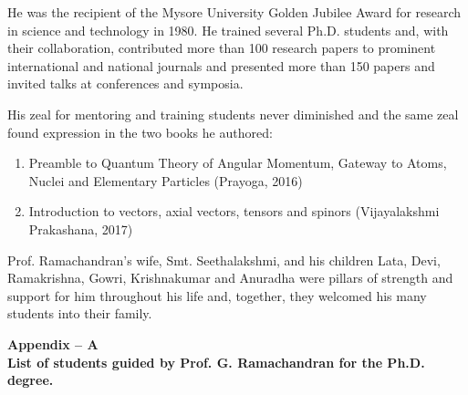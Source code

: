 He was the recipient of the Mysore University Golden Jubilee Award for research in science and technology in 1980. He trained several Ph.D. students and, with their collaboration, contributed more than 100 research papers to prominent international and national journals and presented more than 150 papers and invited talks at conferences and symposia.

His zeal for mentoring and training students never diminished and the same zeal found expression in the two books he authored:
\begin{enumerate}
\item Preamble to Quantum Theory of Angular Momentum, Gateway to Atoms, Nuclei and Elementary Particles (Prayoga, 2016)

\item Introduction to vectors, axial vectors, tensors and spinors (Vijayalakshmi Prakashana, 2017)
\end{enumerate}

Prof. Ramachandran's wife, Smt. Seethalakshmi, and his children Lata, Devi, Ramakrishna, Gowri, Krishnakumar and Anuradha were pillars of strength and support for him throughout his life and, together, they welcomed his many students into their family.

\eject

\begin{center}
\textbf{Appendix -- A}\\[4pt]
\textbf{List of students guided by Prof. G. Ramachandran for the Ph.D. degree.}
\end{center}

